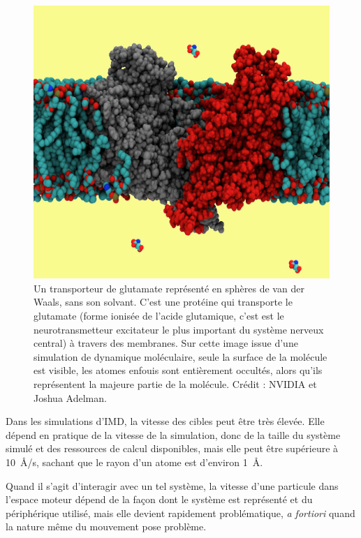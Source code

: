 	\begin{figure}[H]
		\centering
		\includegraphics[width=\textwidth]{figures/ch1/gluTrans}
		\caption[Transporteur de glutamate, très forte occultation.]{Un transporteur de glutamate représenté en sphères de van der Waals, sans son solvant. C'est une protéine qui transporte le glutamate (forme ionisée de l'acide glutamique, c'est est le neurotransmetteur excitateur le plus important du système nerveux central) à travers des membranes. Sur cette image issue d'une simulation de dynamique moléculaire, seule la surface de la molécule est visible, les atomes \og enfouis \fg{} sont entièrement occultés, alors qu'ils représentent la majeure partie de la molécule. Crédit : NVIDIA et Joshua Adelman\footnotemark.}
		\label{fig:gluTrans}
	\end{figure}
	
	
	Dans les simulations d'IMD, la vitesse des cibles peut être très élevée. Elle dépend en pratique de la vitesse de la simulation, donc de la taille du système simulé et des ressources de calcul disponibles, mais elle peut être supérieure à 10~\r{A}/s, sachant que le rayon d'un atome est d'environ 1~\r{A}.
	
	Quand il s'agit d'interagir avec un tel système, la vitesse d'une particule dans l'espace moteur dépend de la façon dont le système est représenté et du périphérique utilisé, mais elle devient rapidement problématique, \emph{a fortiori} quand la nature même du mouvement pose problème.
	
